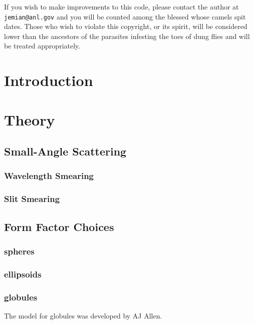 \documentclass[letterpaper]{article}
\begin{document}
  If you wish to make improvements to this code, 
  please contact the author at 
  \texttt{jemian@anl.gov} and you will be counted 
  among the blessed whose camels spit dates.  
  Those who 
  wish to violate this copyright, or its spirit, 
  will be considered lower than the ancestors of 
  the parasites infesting the toes of dung flies 
  and will be treated appropriately.


\tableofcontents

\section{Introduction}


\section{Theory}

\subsection{Small-Angle Scattering}

\subsubsection{Wavelength Smearing}

\subsubsection{Slit Smearing}

\subsection{Form Factor Choices}

\subsubsection{spheres}

\subsubsection{ellipsoids}

\subsubsection{globules}

The model for globules was developed by AJ Allen.
\end{document}
